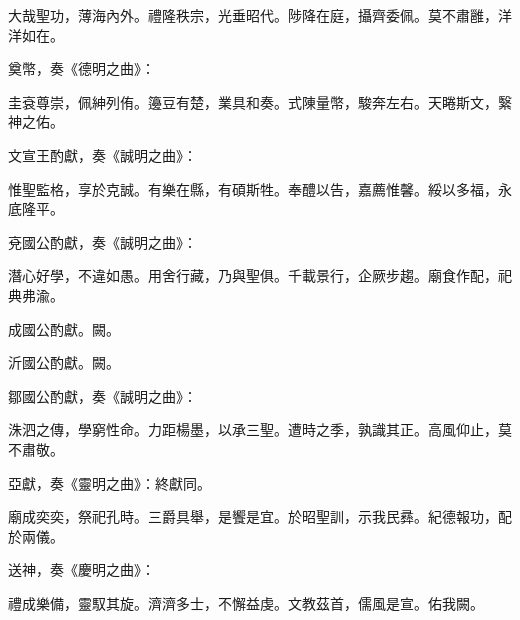\begin{pinyinscope}
 大哉聖功，薄海內外。禮隆秩宗，光垂昭代。陟降在庭，攝齊委佩。莫不肅雝，洋洋如在。



 奠幣，奏《德明之曲》：



 圭袞尊崇，佩紳列侑。籩豆有楚，業具和奏。式陳量幣，駿奔左右。天睠斯文，繄神之佑。



 文宣王酌獻，奏《誠明之曲》：



 惟聖監格，享於克誠。有樂在縣，有碩斯牲。奉醴以告，嘉薦惟馨。綏以多福，永底隆平。



 兗國公酌獻，奏《誠明之曲》：



 潛心好學，不違如愚。用舍行藏，乃與聖俱。千載景行，企厥步趨。廟食作配，祀典弗渝。



 成國公酌獻。闕。



 沂國公酌獻。闕。



 鄒國公酌獻，奏《誠明之曲》：



 洙泗之傳，學窮性命。力距楊墨，以承三聖。遭時之季，孰識其正。高風仰止，莫不肅敬。



 亞獻，奏《靈明之曲》：終獻同。



 廟成奕奕，祭祀孔時。三爵具舉，是饗是宜。於昭聖訓，示我民彞。紀德報功，配於兩儀。



 送神，奏《慶明之曲》：



 禮成樂備，靈馭其旋。濟濟多士，不懈益虔。文教茲首，儒風是宣。佑我闕。



\end{pinyinscope}
